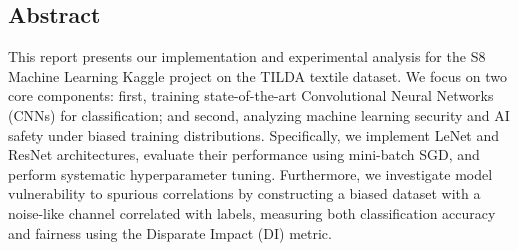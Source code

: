 \documentclass{name}
\newcounter{pagezero}
\begin{document}



\fairemarges %
\fairepagedegarde %

\newpage
\setcounter{pagezero}{0}

\begin{center}
	\begin{minipage}{13cm}
	    \begin{center}
	        \section*{Abstract}
	    \end{center}
	    This report presents our implementation and experimental analysis for the S8 Machine Learning Kaggle project on the TILDA textile dataset. 
	    We focus on two core components: first, training state-of-the-art Convolutional Neural Networks (CNNs) for classification; and second, analyzing machine learning security and AI safety under biased training distributions. 
	    Specifically, we implement LeNet and ResNet architectures, evaluate their performance using mini-batch SGD, and perform systematic hyperparameter tuning. 
	    Furthermore, we investigate model vulnerability to spurious correlations by constructing a biased dataset with a noise-like channel correlated with labels, measuring both classification accuracy and fairness using the Disparate Impact (DI) metric.
	\end{minipage}
\end{center}

\par 
\setcounter{page}{\value{pagezero}}

\newpage
\setcounter{page}{\value{pagezero}}
\tableofcontents

\newpage
\end{document}
